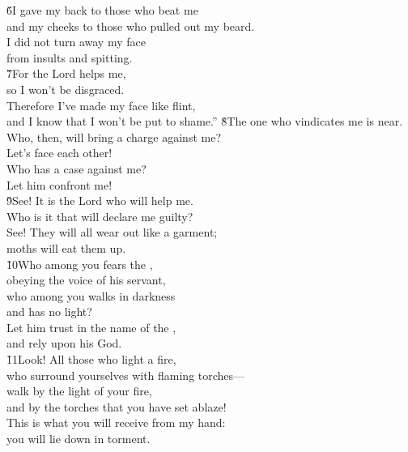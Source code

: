 \begin{poetry}
\poeml \v{6}I gave my back to those who beat me \\
\poemll    and my cheeks to those who pulled out my beard. \\
\poeml I did not turn away my face \\
\poemll    from insults and spitting. \\
\poeml \v{7}For the Lord  helps me, \\
\poemll    so I won't be disgraced. \\
\poeml Therefore I've made my face like flint, \\
\poemll    and I know that I won't be put to shame.''
\poeml \v{8}The one who vindicates me is near. \\
\poemll    Who, then, will bring a charge against me? \\
\poemlll       Let's face each other! \\
\poeml Who has a case against me? \\
\poemll    Let him confront me! \\
\poeml \v{9}See! It is the Lord  who will help me. \\
\poemll    Who is it that will declare me guilty? \\
\poeml See! They will all wear out like a garment; \\
\poemll    moths will eat them up. \\
\poeml \v{10}Who among you fears the , \\
\poemll    obeying the voice of his servant, \\
\poeml who among you walks in darkness \\
\poemll    and has no light? \\
\poeml Let him trust in the name of the , \\
\poemll    and rely upon his God. \\
\poeml \v{11}Look! All those who light a fire, \\
\poemll    who surround yourselves with flaming torches--- \\
\poeml walk by the light of your fire, \\
\poemll    and by the torches that you have set ablaze! \\
\poeml This is what you will receive from my hand: \\
\poemll    you will lie down in torment.
\end{poetry}

